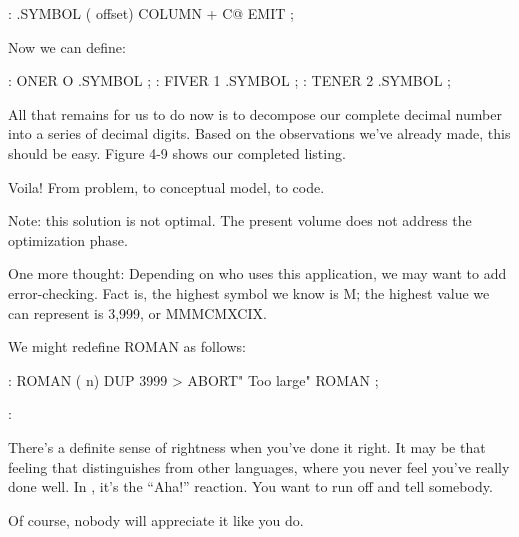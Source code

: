 \begin{Code}
: .SYMBOL  ( offset)  COLUMN +  C@ EMIT ;
\end{Code}
Now we can define:

\begin{Code}
: ONER    O .SYMBOL ;
: FIVER   1 .SYMBOL ;
: TENER   2 .SYMBOL ;
\end{Code}
All that remains for us to do now is to decompose our complete decimal
number into a series of decimal digits. Based on the observations we've
already made, this should be easy. Figure 4-9 shows our completed
listing.

Voila! From problem, to conceptual model, to code.

Note: this solution is not optimal. The present volume does not address
the optimization phase.

One more thought: Depending on who uses this application, we may
want to add error-checking. Fact is, the highest symbol we know is M; the
highest value we can represent is 3,999, or MMMCMXCIX.

\goodbreak
We might redefine ROMAN as follows:

\begin{Code}
: ROMAN  ( n)
   DUP  3999 >  ABORT" Too large"  ROMAN ;
\end{Code}

\begin{interview}
:

\begin{tfquot}
There's a definite sense of rightness when you've done it right. It may be
that feeling that distinguishes \Forth{} from other languages, where you
never feel you've really done well. In \Forth{}, it's the ``Aha!'' reaction. You
want to run off and tell somebody.

Of course, nobody will appreciate it like you do.
\end{tfquot}
\end{interview}

